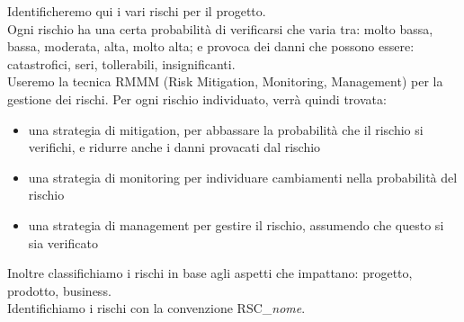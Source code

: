 Identificheremo qui i vari rischi per il progetto.\\
Ogni rischio ha una certa probabilità di verificarsi che varia tra: molto bassa, bassa, moderata, alta, molto alta; e provoca dei danni che possono essere: catastrofici, seri, tollerabili, insignificanti.\\
Useremo la tecnica RMMM (Risk Mitigation, Monitoring, Management) per la gestione dei rischi. Per ogni rischio individuato, verrà quindi trovata: 
\begin{itemize}
	\item una strategia di mitigation, per abbassare la probabilità che il rischio si verifichi, e ridurre anche i danni provacati dal rischio
	\item una strategia di monitoring per individuare cambiamenti nella probabilità del rischio
	\item una strategia di management per gestire il rischio, assumendo che questo si sia verificato
\end{itemize}
Inoltre classifichiamo i rischi in base agli aspetti che impattano: progetto, prodotto, business. \\
Identifichiamo i rischi con la convenzione RSC\_\textit{nome}. \\





